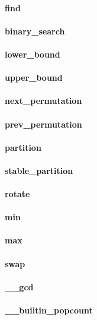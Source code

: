 \documentclass[8pt, a4paper, twocolumn]{article}
\begin{document}
\paragraph{find}
\paragraph{binary\_search}
\paragraph{lower\_bound}
\paragraph{upper\_bound}
\paragraph{next\_permutation}
\paragraph{prev\_permutation}
\paragraph{partition}
\paragraph{stable\_partition}
\paragraph{rotate}
\paragraph{min}
\paragraph{max}
\paragraph{swap}
\paragraph{\_\_gcd}
\paragraph{\_\_builtin\_popcount}
\end{document}
